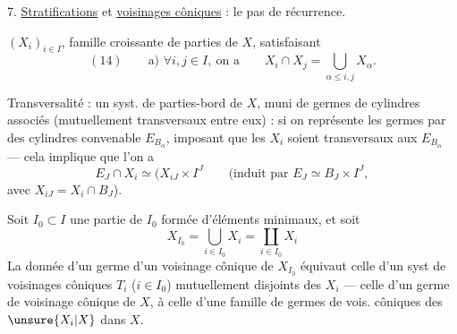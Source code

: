 7. \uline{Stratifications} et \uline{voisinages côniques} : le pas
de récurrence.

$(X_i)_{i\in I}$, famille croissante de parties de $X$,
satisfaisant
\[
(14)\qquad\text{a) }\forall i,j\in I,\ \text{on a}\qquad
X_i\cap X_j=\bigcup_{\alpha\le i,j}X_\alpha.
\]


Transversalité : un syst. de parties-bord  de
$X$, muni de germes de cylindres associés
(mutuellement transversaux entre eux) : si on
représente les germes par des cylindres convenable
$E_{B_\alpha}$, imposant que les $X_i$ soient transversaux
aux $E_{B_\alpha}$ --- cela implique que l'on a
\[
E_J\cap X_i\simeq (X_{iJ}\times I^J
\qquad
\text{(induit par }E_J\simeq B_J\times I^J,
\]
avec $X_{iJ}=X_i\cap B_J$).

Soit $I_0\subset I$ une partie de $I_0$ formée
d'éléments minimaux,  et soit
\[
X_{I_0}=\bigcup_{i\in I_0}X_i=\coprod_{i\in I_0}X_i
\]
La donnée d'un germe 
d'un voisinage cônique  de $X_{I_0}$ équivaut 
celle d'un syst de voisinages côniques
$T_i$ ($i\in I_0$) mutuellement disjoints des $X_i$ ---
celle d'un germe de voisinage cônique de $X$,
à celle d'une famille de germes de vois.
côniques des $\unsure{X_i|X}$ dans $X$.
